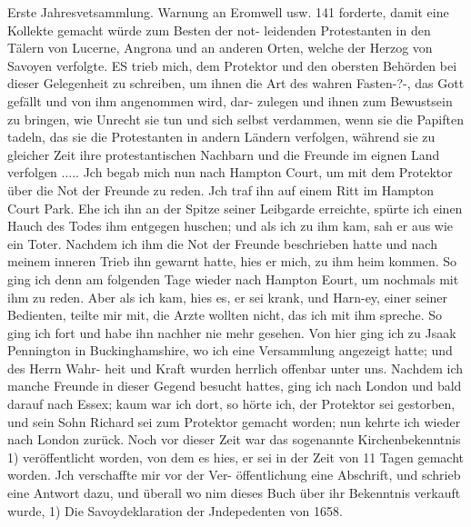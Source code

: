Erste Jahresvetsammlung. Warnung an Eromwell usw. 141
forderte, damit eine Kollekte gemacht würde zum Besten der not-
leidenden Protestanten in den Tälern von Lucerne, Angrona und
an anderen Orten, welche der Herzog von Savoyen verfolgte.
ES trieb mich, dem Protektor und den obersten Behörden bei
dieser Gelegenheit zu schreiben, um ihnen die Art des wahren
Fasten-?-, das Gott gefällt und von ihm angenommen wird, dar-
zulegen und ihnen zum Bewustsein zu bringen, wie Unrecht sie
tun und sich selbst verdammen, wenn sie die Papiften tadeln,
das sie die Protestanten in andern Ländern verfolgen, während
sie zu gleicher Zeit ihre protestantischen Nachbarn und die
Freunde im eignen Land verfolgen .....
Jch begab mich nun nach Hampton Court, um mit dem
Protektor über die Not der Freunde zu reden. Jch traf ihn auf
einem Ritt im Hampton Court Park. Ehe ich ihn an der Spitze
seiner Leibgarde erreichte, spürte ich einen Hauch des Todes
ihm entgegen huschen; und als ich zu ihm kam, sah er aus wie
ein Toter. Nachdem ich ihm die Not der Freunde beschrieben
hatte und nach meinem inneren Trieb ihn gewarnt hatte, hies
er mich, zu ihm heim kommen. So ging ich denn am folgenden
Tage wieder nach Hampton Eourt, um nochmals mit ihm zu
reden. Aber als ich kam, hies es, er sei krank, und Harn-ey,
einer seiner Bedienten, teilte mir mit, die Arzte wollten nicht,
das ich mit ihm spreche. So ging ich fort und habe ihn nachher
nie mehr gesehen.
Von hier ging ich zu Jsaak Pennington in Buckinghamshire,
wo ich eine Versammlung angezeigt hatte; und des Herrn Wahr-
heit und Kraft wurden herrlich offenbar unter uns. Nachdem
ich manche Freunde in dieser Gegend besucht hattes, ging ich
nach London und bald darauf nach Essex; kaum war ich dort,
so hörte ich, der Protektor sei gestorben, und sein Sohn Richard
sei zum Protektor gemacht worden; nun kehrte ich wieder nach
London zurück.
Noch vor dieser Zeit war das sogenannte Kirchenbekenntnis 1)
veröffentlicht worden, von dem es hies, er sei in der Zeit von
11 Tagen gemacht worden. Jch verschaffte mir vor der Ver-
öffentlichung eine Abschrift, und schrieb eine Antwort dazu, und
überall wo nim dieses Buch über ihr Bekenntnis verkauft wurde,
1) Die Savoydeklaration der Jndepedenten von 1658.


